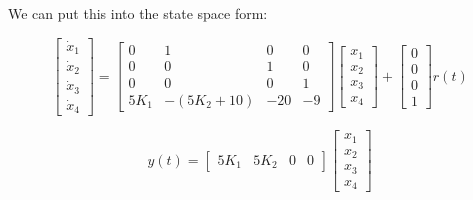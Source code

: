 \documentclass[12pt, letterpaper]{../assignment}
\begin{document}
We can put this into the state space form:

\begin{answer}
    \begin{equation*}
        \begin{bmatrix}
            \dot{x}_1\\ \dot{x}_2\\ \dot{x}_3\\ \dot{x}_4
        \end{bmatrix}=
        \begin{bmatrix}
            0 & 1 & 0 & 0 \\
            0 & 0 & 1 & 0 \\
            0 & 0 & 0 & 1 \\
            5 K_1 & -(5 K_2 + 10) & -20 & -9
        \end{bmatrix}
        \begin{bmatrix}
            x_1\\ x_2\\ x_3\\ x_4
        \end{bmatrix}
        + \begin{bmatrix}
            0\\ 0\\ 0\\ 1
        \end{bmatrix} r(t)
    \end{equation*}
\end{answer}
\begin{answer}
    \begin{equation*}
        y(t)=
        \begin{bmatrix}
            5 K_1 & 5 K_2 & 0 & 0
        \end{bmatrix}
        \begin{bmatrix}
            x_1\\ x_2\\ x_3\\ x_4
        \end{bmatrix}
    \end{equation*}
\end{answer}
\end{document}
